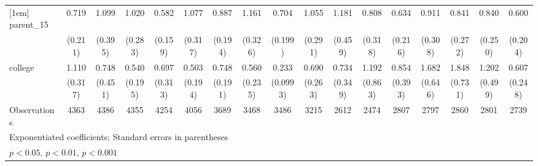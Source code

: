{\begin{tabular}{l*{16}{c}}
[1em]
parent\_15           &       0.719         &       1.099         &       1.020         &       0.582\sym{*}  &       1.077         &       0.887         &       1.161         &       0.704         &       1.055         &       1.181         &       0.808         &       0.634         &       0.911         &       0.841         &       0.840         &       0.600         \\
                    &     (0.211)         &     (0.395)         &     (0.283)         &     (0.159)         &     (0.317)         &     (0.194)         &     (0.326)         &     (0.199)         &     (0.291)         &     (0.459)         &     (0.318)         &     (0.216)         &     (0.308)         &     (0.272)         &     (0.250)         &     (0.204)         \\
[1em]
college             &       1.110         &       0.748         &       0.540         &       0.697         &       0.503         &       0.748         &       0.560         &       0.233\sym{***}&       0.690         &       0.734         &       1.192         &       0.854         &       1.682         &       1.848         &       1.202         &       0.607         \\
                    &     (0.317)         &     (0.451)         &     (0.195)         &     (0.313)         &     (0.194)         &     (0.191)         &     (0.235)         &    (0.0993)         &     (0.263)         &     (0.349)         &     (0.863)         &     (0.393)         &     (0.646)         &     (0.731)         &     (0.499)         &     (0.248)         \\
\hline
Observations        &        4363         &        4386         &        4355         &        4254         &        4056         &        3689         &        3468         &        3486         &        3215         &        2612         &        2474         &        2807         &        2797         &        2860         &        2801         &        2739         \\
\hline\hline
\multicolumn{17}{l}{\footnotesize Exponentiated coefficients; Standard errors in parentheses}\\
\multicolumn{17}{l}{\footnotesize \sym{*} \(p<0.05\), \sym{**} \(p<0.01\), \sym{***} \(p<0.001\)}\\
\end{tabular}
}

